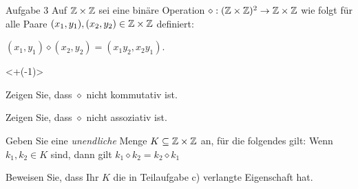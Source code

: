 \begin{frame}{Aufgabe 3}
        Auf $\mathbb{Z} \times \mathbb{Z}$ sei eine binäre Operation $\diamond: (\mathbb{Z} \times \mathbb{Z})^2 \to \mathbb{Z} \times \mathbb{Z}$ wie folgt für alle Paare $(x_1, y_1),(x_2, y_2) \in \mathbb{Z} \times \mathbb{Z}$ definiert:
        \begin{center}
            $(x_1, y_1) \diamond (x_2, y_2) = (x_1 y_2, x_2y_1)$.
        \end{center}
        \visible<+(-1)>{}
    
        \begin{alist}
            \item Zeigen Sie, dass $\diamond$ nicht kommutativ ist. \\
            \item Zeigen Sie, dass $\diamond$ nicht assoziativ ist. \\
            \item Geben Sie eine \textit{unendliche} Menge $K \subseteq \mathbb{Z} \times \mathbb{Z}$ an, für die folgendes gilt: Wenn $k_1, k_2 \in K$ sind, dann gilt $k_1 \diamond k_2 = k_2 \diamond k_1$ \\
            \item Beweisen Sie, dass Ihr $K$ die in Teilaufgabe c) verlangte Eigenschaft hat.\\
        \end{alist}
\end{frame}